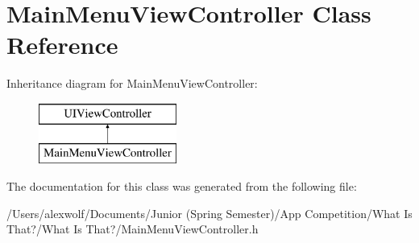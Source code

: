 \hypertarget{interface_main_menu_view_controller}{\section{Main\-Menu\-View\-Controller Class Reference}
\label{interface_main_menu_view_controller}
}
Inheritance diagram for Main\-Menu\-View\-Controller\-:\begin{figure}[H]
\begin{center}
\leavevmode
\includegraphics[height=2.000000cm]{interface_main_menu_view_controller}
\end{center}
\end{figure}


The documentation for this class was generated from the following file\-:\begin{DoxyCompactItemize}
\item 
/\-Users/alexwolf/\-Documents/\-Junior (\-Spring Semester)/\-App Competition/\-What Is That?/\-What Is That?/Main\-Menu\-View\-Controller.\-h\end{DoxyCompactItemize}
